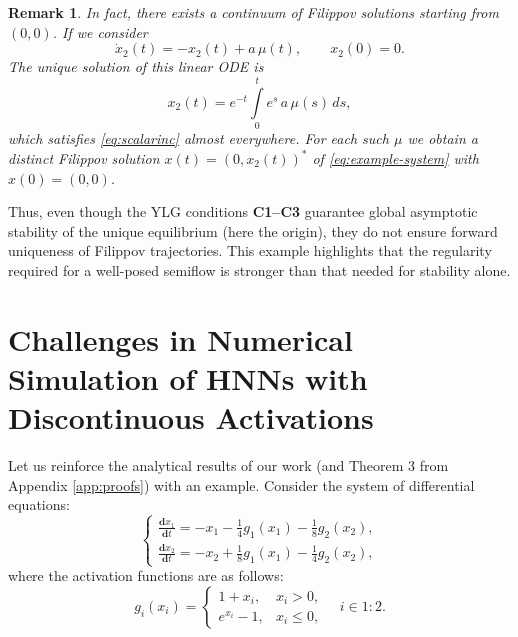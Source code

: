 \documentclass[journal]{IEEEtran}
\theoremstyle{myplain}
\newtheorem{remark}{Remark}
\begin{document}
\begin{remark}
In fact, there exists a continuum of Filippov solutions starting from $(0,0)$. If we consider
\[
\dot{x}_{2}(t)=-x_{2}(t)+a\,\mu(t),\qquad x_{2}(0)=0.
\]
The unique solution of this linear ODE is
\[
x_{2}(t)=e^{-t}\int\limits_{0}^{t}e^{s}\,a\,\mu(s)\,ds,
\]
which satisfies \eqref{eq:scalarinc} almost everywhere. For each such $\mu$ we obtain a distinct Filippov solution $x(t)=(0,x_{2}(t))^{*}$ of \eqref{eq:example-system} with $x(0)=(0,0)$.
\end{remark}


Thus, even though the YLG conditions \textbf{C1--C3} guarantee global asymptotic stability of the unique equilibrium (here the origin), they do not ensure forward uniqueness of Filippov trajectories. This example highlights that the regularity required for a well-posed semiflow is stronger than that needed for stability alone.

\section{Challenges in Numerical Simulation of HNNs with Discontinuous Activations}\label{sec:examples}


Let us reinforce the analytical results of our work 
(and Theorem 3 from Appendix \ref{app:proofs}) with an example.
Consider the system of differential equations:
\begin{equation}\label{example1}
\begin{cases}\frac{\mathbf{d}x_1}{\mathbf{d}{t}}=-x_1-\frac 1 4 g_1(x_1)-\frac 1 8 g_2(x_2),\\\frac{\mathbf{d}x_2}{\mathbf{d}{t}}=-x_2+\frac 1 8 g_1(x_1)-\frac 1 4 g_2(x_2),\end{cases}
\end{equation}
where the activation functions are as follows:
\begin{equation*}
    g_i(x_i) = \begin{cases}1+x_i,&x_i>0,\\ e^{x_i}-1, &x_i\leqslant0,\end{cases} \quad i\in 1:2.
\end{equation*}
\end{document}
